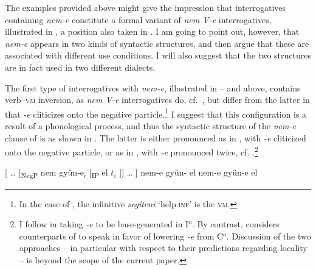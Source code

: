 \documentclass[output=paper,colorlinks,citecolor=brown]{langscibook}
\begin{document}
	The examples provided above might give the impression that interrogatives containing \textit{nem-e} constitute a formal variant of \textit{nem V-e} interrogatives, illustrated in , a position also taken in \citet{kenesei-etal}. I am going to point out, however, that  \textit{nem-e}  appears in two kinds of syntactic structures, and then argue that these are associated with different use conditions. I will also suggest that the two structures are in fact used in two different dialects. 
	
	The first type of interrogatives with \textit{nem-e}, illustrated in -- and   above, contains verb--\textsc{vm} inversion, as \textit{nem V-e} interrogatives do, cf.~, but differ from the latter in that \textit{-e} cliticizes onto the negative particle.\footnote{In the case of , the infinitive \textit{segíteni} `help.\textsc{inf}' is the \textsc{vm}.}  I suggest that this configuration is a result of a phonological process, and thus the syntactic structure of  the \textit{nem-e} clause of  is as shown in . The latter is either pronounced as in , with \textit{-e} cliticized onto the negative particle, or as in , with \textit{-e} pronounced twice, cf. .\footnote{I follow \citet{gaertner+gyuris2022}  in taking \textit{-e} to be base-generated in I$^\text{o}$. By contrast, \citet[342]{kenesei1994} considers counterparts of  to speak in favor of lowering \textit{-e} from C$^\text{o}$. Discussion of the two approaches -- in particular with respect to  their predictions regarding locality -- is beyond the scope of the current paper.}
	
	
	
	\ea
	\ea\label{ex:gyun-str}
	[ \dots { } [\textsubscript{NegP} nem gyün-e$_i$ [\textsubscript{IP} el $t_i$ ]] \dots {} ]
	\ex\label{ex:pron-single}
	nem-e gyün- el
	\ex\label{ex:pron-double}
	nem-e gyün-e el
	\z
	\z
	
	
	
\end{document}
